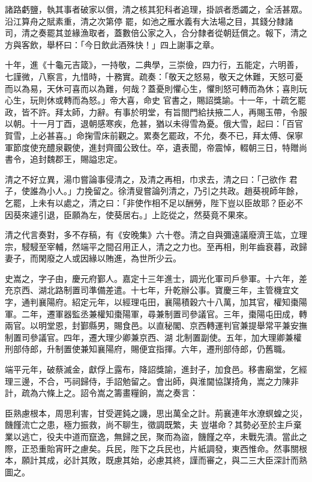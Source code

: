 \begin{pinyinscope}
 諸路虧鹽，執其事者破家以償，清之核其犯科者追理，掛誤者悉蠲之，全活甚眾。沿江算舟之賦素重，清之次第停
 罷，如池之雁水義有大法場之目，其錢分隸諸司，清之奏罷其並緣漁取者，蓋數倍公家之入，合分隸者從朝廷償之。報下，清之方與客飲，舉杯曰：「今日飲此酒殊快！」四上謝事之章。



 十年，進《十龜元吉箴》，一持敬，二典學，三崇儉，四力行，五能定，六明善，七謹微，八察言，九惜時，十務實。疏奏：「敬天之怒易，敬天之休難，天怒可憂而以為易，天休可喜而以為難，何哉？蓋憂則懼心生，懼則怒可轉而為休；喜則玩心生，玩則休或轉而為怒。」帝大喜，命史
 官書之，賜詔獎諭。十一年，十疏乞罷政，皆不許。拜太師，力辭。有事於明堂，有旨閤門給扶掖二人，再賜玉帶，令服以朝。十一月丁酉，退朝感寒疾，危甚，猶以未得雪為憂。俄大雪，起曰：「百官賀雪，上必甚喜。」命掬雪床前觀之。累奏乞罷政，不允，奏不已，拜太傅、保寧軍節度使充醴泉觀使，進封齊國公致仕。卒，遺表聞，帝震悼，輟朝三日，特贈尚書令，追封魏郡王，賜謚忠定。



 清之不好立異，湯巾嘗論事侵清之，及清之再相，巾求去，清之曰：「己欲作
 君子，使誰為小人。」力挽留之。徐清叟嘗論列清之，乃引之共政。趙葵視師年餘，乞罷，上未有以處之，清之曰：「非使作相不足以酬勞，陛下豈以臣故耶？臣必不因葵來遽引退，臣願為左，使葵居右。」上訖從之，然葵竟不果來。



 清之代言奏對，多不存稿，有《安晚集》六十卷。清之自與彌遠議廢濟王竑，立理宗，駸駸至宰輔，然端平之間召用正人，清之之力也。至再相，則年齒衰暮，政歸妻子，而閑廢之人或因緣以賄進，為世所少云。



 史嵩之，字子由，慶元府鄞人。嘉定十三年進士，調光化軍司戶參軍。十六年，差充京西、湖北路制置司準備差遣。十七年，升乾辦公事。寶慶三年，主管機宜文字，通判襄陽府。紹定元年，以經理屯田，襄陽積穀六十八萬，加其官，權知棗陽軍。二年，遷軍器監丞兼權知棗陽軍，尋兼制置司參議官。三年，棗陽屯田成，轉兩官。以明堂恩，封鄞縣男，賜食邑。以直秘閣、京西轉運判官兼提舉常平兼安撫制置司參議官。四年，遷大理少卿兼京西、湖
 北制置副使。五年，加大理卿兼權刑部侍郎，升制置使兼知襄陽府，賜便宜指揮。六年，遷刑部侍郎，仍舊職。



 端平元年，破蔡滅金，獻俘上露布，降詔獎諭，進封子，加食邑。移書廟堂，乞經理三邊，不合，丐祠歸侍，手詔勉留之。會出師，與淮閫協謀掎角，嵩之力陳非計，疏為六條上之。詔令嵩之籌畫糧餉，嵩之奏言：



 臣熟慮根本，周思利害，甘受遲鈍之譏，思出萬全之計。荊襄連年水潦螟蝗之災，饑饉流亡之患，極力振救，尚不聊生，徵調既繁，夫
 豈堪命？其勢必至於主戶棄業以逃亡，役夫中道而竄逸，無歸之民，聚而為盜，饑饉之卒，未戰先潰。當此之際，正恐重貽宵旰之慮矣。兵民，陛下之兵民也，片紙調發，東西惟命。然事關根本，願計其成，必計其敗，既慮其始，必慮其終，謹而審之，與二三大臣深計而熟圖之。




\end{pinyinscope}
